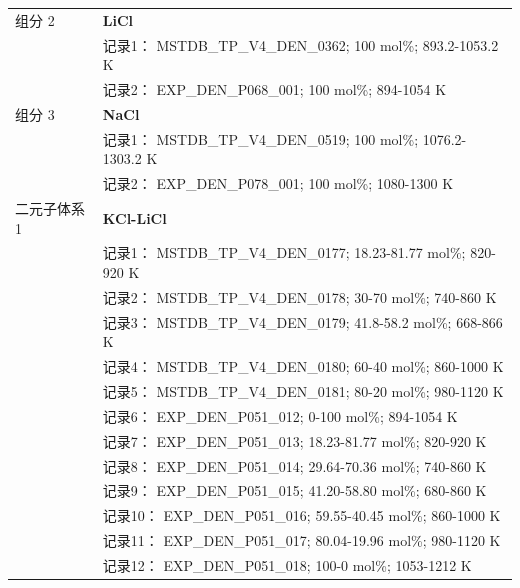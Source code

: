 \documentclass[12pt]{article}
\begin{document}
{\begin{longtable}[]{@{}
  >{\raggedright\arraybackslash}p{}
  >{\raggedright\arraybackslash}p{}@{}}
组分 2  & \textbf{LiCl} \\
 & 记录1： MSTDB\_TP\_V4\_DEN\_0362; 100 mol\%; 893.2-1053.2 K \\
 & 记录2： EXP\_DEN\_P068\_001; 100 mol\%; 894-1054 K  \\

组分 3  & \textbf{NaCl} \\
 & 记录1： MSTDB\_TP\_V4\_DEN\_0519; 100 mol\%; 1076.2-1303.2 K \\
 & 记录2： EXP\_DEN\_P078\_001; 100 mol\%; 1080-1300 K  \\

二元子体系 1  & \textbf{KCl-LiCl} \\
 & 记录1： MSTDB\_TP\_V4\_DEN\_0177; 18.23-81.77 mol\%; 820-920 K \\
 & 记录2： MSTDB\_TP\_V4\_DEN\_0178; 30-70 mol\%; 740-860 K \\
 & 记录3： MSTDB\_TP\_V4\_DEN\_0179; 41.8-58.2 mol\%; 668-866 K \\
 & 记录4： MSTDB\_TP\_V4\_DEN\_0180; 60-40 mol\%; 860-1000 K \\
 & 记录5： MSTDB\_TP\_V4\_DEN\_0181; 80-20 mol\%; 980-1120 K \\
 & 记录6： EXP\_DEN\_P051\_012; 0-100 mol\%; 894-1054 K \\
 & 记录7： EXP\_DEN\_P051\_013; 18.23-81.77 mol\%; 820-920 K \\
 & 记录8： EXP\_DEN\_P051\_014; 29.64-70.36 mol\%; 740-860 K \\
 & 记录9： EXP\_DEN\_P051\_015; 41.20-58.80 mol\%; 680-860 K \\
 & 记录10： EXP\_DEN\_P051\_016; 59.55-40.45 mol\%; 860-1000 K \\
 & 记录11： EXP\_DEN\_P051\_017; 80.04-19.96 mol\%; 980-1120 K \\
 & 记录12： EXP\_DEN\_P051\_018; 100-0 mol\%; 1053-1212 K  \\


\end{longtable}}
\end{document}
